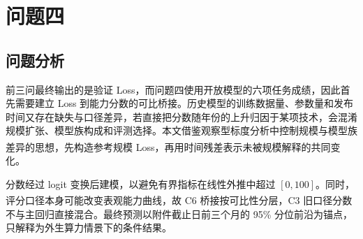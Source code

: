 \documentclass[bwprint]{gmcmthesis}
\numberwithin{equation}{section}
\numberwithin{figure}{section}
\numberwithin{table}{section}
\begin{document}
        
        


\section{问题四}   %
    \subsection{问题分析}

    前三问最终输出的是验证 Loss，而问题四使用开放模型的六项任务成绩，因此首先需要建立 Loss 到能力分数的可比桥接。历史模型的训练数据量、参数量和发布时间又存在缺失与口径差异，若直接把分数随年份的上升归因于某项技术，会混淆规模扩张、模型族构成和评测选择。本文借鉴观察型标度分析中控制规模与模型族差异的思想\textsuperscript{\cite{ruan2024observational}}，先构造参考规模 Loss，再用时间残差表示未被规模解释的共同变化。

    分数经过 logit 变换后建模，以避免有界指标在线性外推中超过 $[0,100]$。同时，评分口径本身可能改变表观能力曲线\textsuperscript{\cite{schaeffer2023emergent}}，故 C6 桥接按可比性分层，C3 旧口径分数不与主回归直接混合。最终预测以附件截止日前三个月的 95\% 分位前沿为锚点，只解释为外生算力情景下的条件结果。
\end{document}
